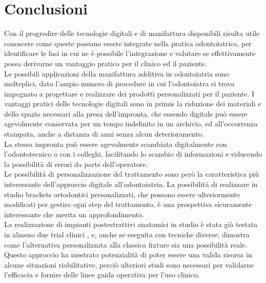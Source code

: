 
\chapter{Conclusioni} %

\label{Conclusions} %

 
 
Con il progredire delle tecnologie digitali e di manifattura disponibili risulta utile conoscere come queste possano essere integrate nella pratica odonto\-iatrica, per identificare le fasi in cui ne è possibile l'integrazione e valutare se effettivamente possa derivarne un vantaggio pratico per il clinico ed il paziente.\\
Le possibili applicazioni della manifattura additiva in odonto\-iatria sono molte\-plici, dato l'ampio numero di procedure in cui l'odontoiatra si trova impegnato a progettare e realizzare dei prodotti personalizzati per il paziente. I vantaggi pratici delle tecnologie digitali sono in primis la riduzione dei materiali e dello spazio necessari alla presa dell'impronta, che essendo digitale può essere agevolmente conservata per un tempo indefinito in un archivio, ed all'occorrenza stampata, anche a distanza di anni senza alcun deterioramento.\\
La stessa impronta può essere agevolmente scambiata digitalmente con l'odonto\-tecnico o con i colleghi, facilitando lo scambio di informazioni e riducendo la possibilità di errori da parte dell'operatore.\\
Le possibilità di personalizzazione del trattamento sono però la caratteristica più interessante dell'approccio digitale all'odontoiatria. La possibilità di realizzare in studio brackets ortodontici personalizzati, che possono essere ulteriormente modificati per gestire ogni step del trattamento, è una prospettiva sicuramente interessante che merita un approfondimento.\\ La realizzazione di impianti postestrattivi anatomici in studio è stata già testata in almeno due trial clinici \parencite{Reference85}, \parencite{Reference87} e, anche se eseguita con tecniche diverse, dimostra come l'alternativa personalizzata alla classica fixture sia una possibilità reale. Questo approccio ha mostrato potenzialità di poter essere una valida risorsa in alcune situazioni riabilitative, perciò ulteriori studi sono necessari per validarne l'efficacia e fornire delle linee guida operativa per l'uso clinico.\\
